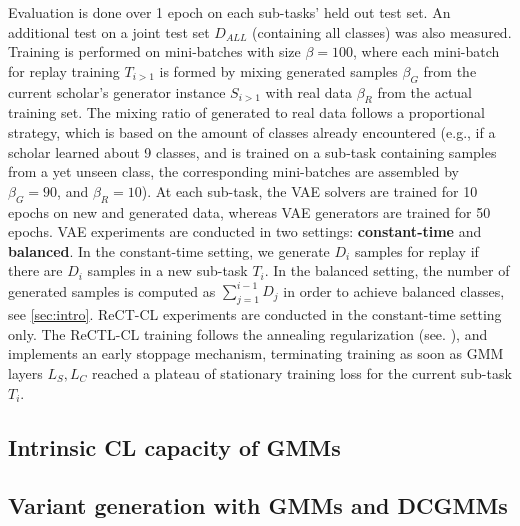 \documentclass{article} %
\begin{document}
%
Evaluation is done over 1 epoch on each sub-tasks' held out test set. An additional test on a joint test set $D_{ALL}$ (containing all classes) was also measured.
%
Training is performed on mini-batches with size $\beta=100$, where each mini-batch for replay training $T_{i>1}$ is formed by mixing generated samples $\beta_G$ from the current scholar's generator instance $S_{i>1}$ with real data $\beta_R$ from the actual training set. 
%
The mixing ratio of generated to real data follows a proportional strategy, which is based on the amount of classes already encountered (e.g., if a scholar learned about 9 classes, and is trained on a sub-task containing samples from a yet unseen class, the corresponding mini-batches are assembled by $\beta_G = 90$, and $\beta_R=10$).
At each sub-task, the VAE solvers are trained for 10 epochs on new and generated data, whereas VAE generators are trained for 50 epochs.
VAE experiments are conducted in two settings: \textbf{constant-time} and \textbf{balanced}. In the constant-time setting, 
we generate $D_i$ samples for replay if there are $D_i$ samples in a new sub-task $T_i$. In the balanced setting, the number of generated samples is computed as $\sum_{j=1}^{i-1} D_j$ in order to achieve balanced classes, see \cref{sec:intro}.
ReCT-CL experiments are conducted in the constant-time setting only.
%
The ReCTL-CL training follows the annealing regularization (see. \cite{sgdgmm}), and implements an early stoppage mechanism, terminating training as soon as GMM layers $L_S, L_C$ reached a plateau of stationary training loss for the current sub-task $T_i$.

\subsection{Intrinsic CL capacity of GMMs}
\subsection{Variant generation with GMMs and DCGMMs}
\end{document}
